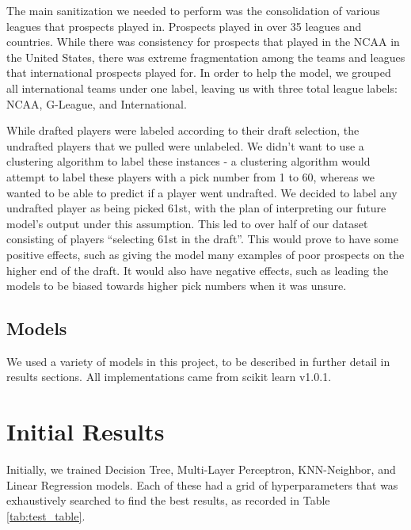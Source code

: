 \documentclass{article}
\begin{document}
The main sanitization we needed to perform was the consolidation of various
leagues that prospects played in. Prospects played in over 35 leagues and
countries. While there was consistency for prospects that played in the NCAA in
the United States, there was extreme fragmentation among the teams and leagues
that international prospects played for. In order to help the model, we grouped
all international teams under one label, leaving us with three total league
labels: NCAA, G-League, and International.

While drafted players were labeled according to their draft selection, the
undrafted players that we pulled were unlabeled. We didn’t want to use a
clustering algorithm to label these instances - a clustering algorithm would
attempt to label these players with a pick number from 1 to 60, whereas we
wanted to be able to predict if a player went undrafted. We decided to label any
undrafted player as being picked 61st, with the plan of interpreting our future
model’s output under this assumption. This led to over half of our dataset
consisting of players “selecting 61st in the draft”. This would prove to have
some positive effects, such as giving the model many examples of poor prospects
on the higher end of the draft. It would also have negative effects, such as
leading the models to be biased towards higher pick numbers when it was unsure. 

\subsection{Models}

We used a variety of models in this project, to be described in further detail
in results sections. All implementations came from scikit learn v1.0.1.

\section{Initial Results}

Initially, we trained Decision Tree, Multi-Layer Perceptron, KNN-Neighbor, and
Linear Regression models. Each of these had a grid of hyperparameters that was
exhaustively searched to find the best results, as recorded in Table
\ref{tab:test_table}.
\end{document}
